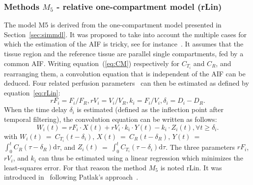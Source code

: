 \subsubsection{Methods $M_5$ - relative one-compartment model (rLin)}
The model M5 is derived from the one-compartment model presented in Section~\ref{sec:simmdl}. It was proposed to take into account the multiple cases for which the estimation of the AIF is tricky, see for instance~\cite{Doury:2017fz}.
It assumes that the tissue region and the reference tissue are parallel single compartments, fed by a common AIF. 
Writing equation~(\ref{eq:CM}) respectively for $C_{T_i}$ and $C_R$, and rearranging them, a convolution equation that is independent of the AIF can be deduced. Four related perfusion parameters~\cite{Doury:2017fz} can then be estimated as defined by equation~\ref{eq:rLin}:
\begin{equation}
rF_i = F_i/F_R, rV_i = V_i/V_R, k_i = F_i/V_i, \delta_i = D_i - D_R.
\label{eq:rLin}
\end{equation}
When the time delay $\delta_i$ is estimated (defined as the inflection point after temporal filtering), the convolution equation can be written as follows:
\begin{equation}
W_i(t)= rF_i \cdot X(t) + rV_i \cdot k_i \cdot Y(t) - k_i \cdot Z_i(t), \forall t \geq \delta_i.
\label{eq:rLin2}
\end{equation} 
 with $W_i(t)$~=~$C_{T_i}(t-\delta_i)$, $X(t)$~=~$C_R(t-\delta_R)$, $Y(t)$~=~$\int_0^t C_R \left(\tau-\delta_R\right)\mathrm d\tau$,
and $Z_i(t)$~=~$\int_0^t C_{T_i} \left(\tau-\delta_i \right)\mathrm d\tau$.
The three parameters $rF_i$, $rV_i$, and $k_i$ can thus be estimated using a linear regression which minimizes the least-squares error. For that reason the method $M_5$ is noted rLin. It was introduced in~\cite{Doury:2016fi} following Patlak's approach~\cite{Patlak:1983id}.

